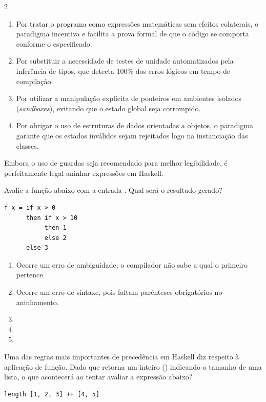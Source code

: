 \documentclass[a4paper,10pt,brazil]{article}
\begin{document}
\begin{multicols}{2}
\begin{enumerate}
  \item Por tratar o programa como expressões matemáticas sem efeitos colaterais, o paradigma incentiva e facilita a prova formal de que o código se comporta conforme o especificado.

  \item Por substituir a necessidade de testes de unidade automatizados pela inferência de tipos, que detecta 100\% dos erros lógicos em tempo de compilação.

  \item Por utilizar a manipulação explícita de ponteiros em ambientes isolados (\emph{sandboxes}), evitando que o estado global seja corrompido.

  \item Por obrigar o uso de estruturas de dados orientadas a objetos, o paradigma garante que os estados inválidos sejam rejeitados logo na instanciação das classes.


\end{enumerate}

Embora o uso de guardas seja recomendado para melhor legibilidade, é perfeitamente legal aninhar expressões  em Haskell. 

Avalie a função abaixo com a entrada . Qual será o resultado gerado?
\begin{verbatim}
f x = if x > 0
      then if x > 10
           then 1
           else 2
      else 3
\end{verbatim}

\begin{enumerate}
  \item Ocorre um erro de ambiguidade; o compilador não sabe a qual  o primeiro  pertence.

  \item Ocorre um erro de sintaxe, pois faltam parênteses obrigatórios no aninhamento.

  \item {}

  \item {}

  \item {}


\end{enumerate}

Uma das regras mais importantes de precedência em Haskell diz respeito à aplicação de função. Dado que  retorna um inteiro () indicando o tamanho de uma lista, o que acontecerá ao tentar avaliar a expressão abaixo?
\begin{verbatim}
length [1, 2, 3] ++ [4, 5]
\end{verbatim}


\end{multicols}
\end{document}
